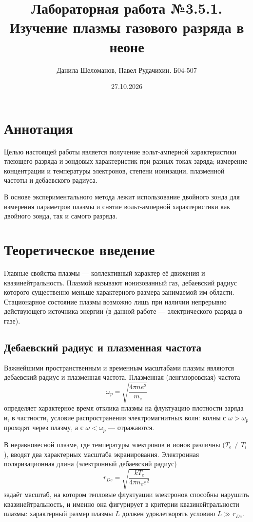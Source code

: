 \documentclass[12pt]{extarticle}
\title{Лабораторная работа №3.5.1. \\ \textbf{Изучение плазмы газового разряда в неоне}}
\author{Данила Шеломанов, Павел Рудачихин. Б04-507}
\date{27.10.2026}
\begin{document}
\maketitle{}


\section {Аннотация} 
	
	\hspace{4.5mm} Целью настоящей работы является получение вольт-амперной характеристики тлеющего разряда и зондовых характеристик при разных токах заряда; измерение концентрации и температуры электронов, степени ионизации, плазменной частоты и дебаевского радиуса.
	
	В основе экспериментального метода лежит использование двойного зонда для измерения параметров плазмы и снятие вольт-амперной характеристики как двойного зонда, так и самого разряда.

\section{Теоретическое введение}

\hspace{4.5mm} Главные свойства плазмы --- коллективный характер её движения и квазинейтральность. Плазмой называют ионизованный газ, дебаевский радиус которого существенно меньше характерного размера занимаемой им области. Стационарное состояние плазмы возможно лишь при наличии непрерывно действующего источника энергии (в данной работе --- электрического разряда в газе).

\subsection{Дебаевский радиус и плазменная частота}

\hspace{4.5mm} Важнейшими пространственным и временным масштабами плазмы являются дебаевский радиус и плазменная частота. Плазменная (ленгмюровская) частота
\begin{equation}
	\omega_p = \sqrt{\frac{4\pi n e^2}{m_e}}
	\label{eq:omega_p}
\end{equation}
определяет характерное время отклика плазмы на флуктуацию плотности заряда и, в частности, условие распространения электромагнитных волн: волны с $\omega > \omega_p$ проходят через плазму, а с $\omega < \omega_p$ --- отражаются.

В неравновесной плазме, где температуры электронов и ионов различны ($T_e \neq T_i$), вводят два характерных масштаба экранирования. Электронная поляризационная длина (электронный дебаевский радиус)
\begin{equation}
	r_{De} = \sqrt{\frac{kT_e}{4\pi n_e e^2}}
	\label{eq:rDe}
\end{equation}
задаёт масштаб, на котором тепловые флуктуации электронов способны нарушить квазинейтральность, и именно она фигурирует в критерии квазинейтральности плазмы: характерный размер плазмы $L$ должен удовлетворять условию $L \gg r_{De}$.
\end{document}
